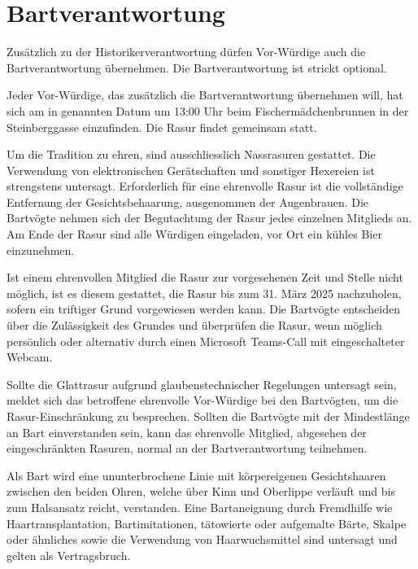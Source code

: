 \documentclass[fontsize=12pt,parskip=half]{scrartcl}
\begin{document}
\section{Bartverantwortung}
\begin{contract}
  \Clause[title={Bartverantwortung}]
  Zusätzlich zu der Historikerverantwortung  dürfen Vor-Würdige auch die Bartverantwortung übernehmen. Die Bartverantwortung ist
  strickt optional.

  \Clause[title={Letzte Rasur}]\label{B.lastrasur}
  Jeder Vor-Würdige, das zusätzlich die Bartverantwortung übernehmen will, hat sich am in  genannten Datum um 13:00 Uhr
  beim Fischermädchenbrunnen in der Steinberggasse einzufinden.
  Die Rasur findet gemeinsam statt.

  \SubClause[title={Durchführung der Rasur}]\label{B.durchfuehrung}
  Um die Tradition zu ehren, sind ausschliesslich Nassrasuren gestattet. Die Verwendung von
  elektronischen Gerätschaften und sonstiger Hexereien ist strengstens untersagt. Erforderlich für eine
  ehrenvolle Rasur ist die vollständige Entfernung der Gesichtsbehaarung, ausgenommen der
  Augenbrauen. Die Bartvögte nehmen sich der Begutachtung der Rasur jedes einzelnen Mitglieds
  an.
  \SubClause[title={Anschliessende Kehlenbefeuchtung}]
  Am Ende der Rasur sind alle Würdigen eingeladen, vor Ort ein kühles Bier einzunehmen.

  \SubClause[title={Rasurverzug}]
  Ist einem ehrenvollen Mitglied die Rasur zur vorgesehenen Zeit und Stelle nicht möglich,
  ist es diesem gestattet, die Rasur bis zum 31. März 2025 nachzuholen, sofern ein triftiger
  Grund vorgewiesen werden kann. Die Bartvögte entscheiden über die Zulässigkeit des Grundes
  und überprüfen die Rasur, wenn möglich persönlich oder alternativ durch einen
  Microsoft Teams-Call mit eingeschalteter Webcam.

  \SubClause[title={Glaubensklausel (Shamess Klausel)}]
  Sollte die Glattrasur aufgrund glaubenstechnischer Regelungen untersagt sein, meldet sich
  das betroffene ehrenvolle Vor-Würdige bei den Bartvögten, um die Rasur-Einschränkung zu
  besprechen. Sollten die Bartvögte mit der Mindestlänge an Bart einverstanden sein,
  kann das ehrenvolle Mitglied, abgesehen der eingeschränkten Rasuren, normal
  an der Bartverantwortung teilnehmen.

  \Clause[title={Bartvorschriften}]
  \SubClause[title={Definition Bart}]
  Als Bart wird eine ununterbrochene Linie mit körpereigenen Gesichtshaaren zwischen den beiden Ohren,
  welche über Kinn und Oberlippe verläuft und bis zum Halsansatz reicht, verstanden. Eine Bartaneignung
  durch Fremdhilfe wie Haartransplantation, Bartimitationen, tätowierte oder aufgemalte Bärte,
  Skalpe oder ähnliches sowie die Verwendung von Haarwuchsmittel sind untersagt und gelten als Vertragsbruch.


\end{contract}
\end{document}
